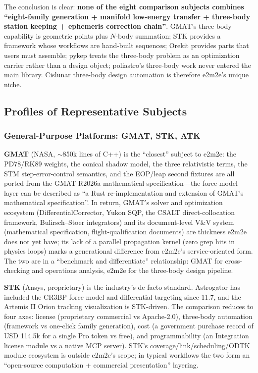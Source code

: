The conclusion is clear: \textbf{none of the eight comparison subjects
combines ``eight-family generation + manifold low-energy transfer +
three-body station keeping + ephemeris correction chain''}. GMAT's three-body
capability is geometric points plus $N$-body summation; STK provides a
framework whose workflows are hand-built sequences; Orekit provides parts
that users must assemble; pykep treats the three-body problem as an
optimization carrier rather than a design object; poliastro's three-body work
never entered the main library. Cislunar three-body design automation is
therefore e2m2e's unique niche.

\subsection{Profiles of Representative Subjects}

\subsubsection{General-Purpose Platforms: GMAT, STK, ATK}

\textbf{GMAT} (NASA, $\sim$850k lines of C++) is the ``closest'' subject to
e2m2e: the PD78/RK89 weights, the conical shadow model, the three
relativistic terms, the STM step-error-control semantics, and the EOP/leap
second fixtures are all ported from the GMAT R2026a mathematical
specification---the force-model layer can be described as ``a Rust
re-implementation and extension of GMAT's mathematical specification''. In
return, GMAT's solver and optimization ecosystem (DifferentialCorrector,
Yukon SQP, the CSALT direct-collocation framework, Bulirsch--Stoer
integrators) and its document-level V\&V system (mathematical specification,
flight-qualification documents) are thickness e2m2e does not yet have; its
lack of a parallel propagation kernel (zero grep hits in physics loops) marks
a generational difference from e2m2e's service-oriented form. The two are in
a ``benchmark and differentiate'' relationship: GMAT for cross-checking and
operations analysis, e2m2e for the three-body design pipeline.

\textbf{STK} (Ansys, proprietary) is the industry's de facto standard.
Astrogator has included the CR3BP force model and differential targeting
since 11.7, and the Artemis II Orion tracking visualization is STK-driven.
The comparison reduces to four axes: license (proprietary commercial vs
Apache-2.0), three-body automation (framework vs one-click family
generation), cost (a government purchase record of USD 114.5k for a single
Pro token vs free), and programmability (an Integration license module vs a
native MCP server). STK's coverage/link/scheduling/ODTK module ecosystem is
outside e2m2e's scope; in typical workflows the two form an ``open-source
computation + commercial presentation'' layering.

